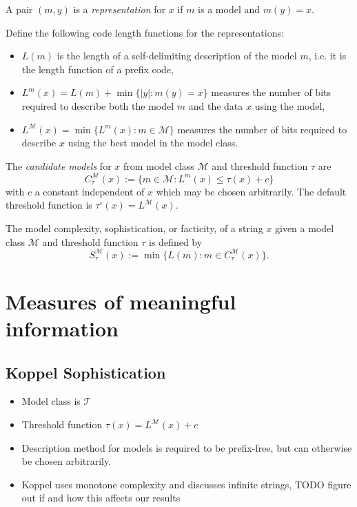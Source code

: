 \documentclass{style/llncs}
\newcommand{\M}{\mathcal M}
\newcommand{\T}{\mathcal T}
\begin{document}
\begin{definition}[Representations]
  A pair $(m,y)$ is a \emph{representation} for $x$ if $m$ is a model
  and $m(y)=x$.
\end{definition}

\begin{definition}
Define the following code length functions for the representations:
\begin{itemize}
\item $L(m)$ is the length of a self-delimiting description of
  the model $m$, i.e. it is the length function of  a prefix code,
\item $L^m(x)=L(m)+\min\{|y|:m(y)=x\}$ measures the number of bits required to describe both the model $m$ and
  the data $x$ using the model,
\item $L^\M(x)=\min\{L^m(x):m\in\M\}$ measures the number of bits
  required to describe $x$ using the best model in the model class.
\end{itemize}
\end{definition}
  
\begin{definition}
  The \emph{candidate models} for $x$ from model class $\M$ and
  threshold function $\tau$ are
  \[
  C^\M_\tau(x):=\{m\in\M:L^m(x)\le \tau(x) + c\}
  \]
  with $c$ a constant independent of $x$ which may be chosen arbitrarily. The default threshold function is $\tau^\circ(x)=L^\M(x)$.
\end{definition}

\begin{definition}[Sophistication]
  The model complexity, sophistication, or facticity, of a string $x$
  given a model class $\M$ and threshold function $\tau$ is defined by
  \[
  S^\M_\tau(x):=\min\{L(m):m\in C^\M_\tau(x)\}.
  \]
\end{definition}

\section{Measures of meaningful information}

\subsection{Koppel Sophistication}

\begin{itemize}
\item Model class is $\T$
\item Threshold function $\tau(x)=L^\M(x)+c$
\item Description method for models is required to be prefix-free, but
  can otherwise be chosen arbitrarily.
\item Koppel uses monotone complexity and discusses infinite strings,
  TODO figure out if and how this affects our results
\end{itemize}
\end{document}
